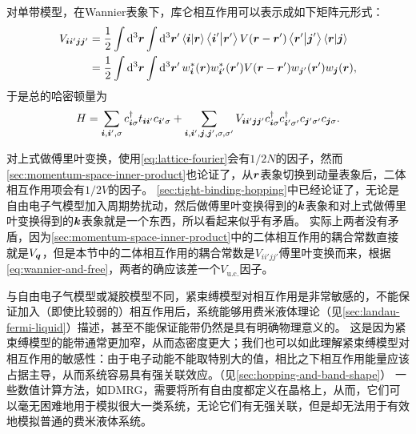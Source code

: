 对单带模型，在Wannier表象下，库仑相互作用可以表示成如下矩阵元形式：
\begin{equation}
    \begin{aligned}
        V_{\vb*{i} \vb*{i}' \vb*{j} \vb*{j}'} &= \frac{1}{2} \int \dd[3]{\vb*{r}} \int \dd[3]{\vb*{r}'} \braket{\vb*{i}}{\vb*{r}} \braket{\vb*{i}'}{\vb*{r}'} V(\vb*{r} - \vb*{r}') \braket{\vb*{r}'}{\vb*{j}'} \braket{\vb*{r}}{\vb*{j}} \\
        &= \frac{1}{2} \int \dd[3]{\vb*{r}} \int \dd[3]{\vb*{r}'} w_{\vb*{i}}^*(\vb*{r}) w_{\vb*{i}'}^*(\vb*{r}') V(\vb*{r} - \vb*{r}') w_{\vb*{j}'}(\vb*{r}') w_{\vb*{j}}(\vb*{r}),
    \end{aligned}
    \label{eq:wannier-basis-interaction}
\end{equation}
于是总的哈密顿量为
\begin{equation}
    H = \sum_{\vb*{i}, \vb*{i}', \sigma} c^\dagger_{\vb*{i} \sigma} t_{\vb*{i} \vb*{i}'} c_{\vb*{i}' \sigma} + \sum_{\vb*{i}, \vb*{i}', \vb*{j}, \vb*{j}', \sigma, \sigma'} V_{\vb*{i} \vb*{i}' \vb*{j} \vb*{j}'} c^\dagger_{\vb*{i} \sigma} c^\dagger_{\vb*{i}' \sigma'} c_{\vb*{j}' \sigma'} c_{\vb*{j} \sigma}.
\end{equation}

对上式做傅里叶变换，使用\eqref{eq:lattice-fourier}会有$1/2N$的因子，然而\autoref{sec:momentum-space-inner-product}也论证了，从$\vb*{r}$表象切换到动量表象后，二体相互作用项会有$1/2V$的因子。
\autoref{sec:tight-binding-hopping}中已经论证了，无论是自由电子气模型加入周期势扰动，然后做傅里叶变换得到的$\vb*{k}$表象和对上式做傅里叶变换得到的$\vb*{k}$表象就是一个东西，所以看起来似乎有矛盾。
实际上两者没有矛盾，因为\autoref{sec:momentum-space-inner-product}中的二体相互作用的耦合常数直接就是$V_{\vb*{q}}$，但是本节中的二体相互作用的耦合常数是$V_{i i' j j'}$傅里叶变换而来，根据\eqref{eq:wannier-and-free}，两者的确应该差一个$V_\text{u.c.}$因子。

与自由电子气模型或凝胶模型不同，紧束缚模型对相互作用是非常敏感的，不能保证加入（即使比较弱的）相互作用后，系统能够用费米液体理论（见\autoref{sec:landau-fermi-liquid}）描述，甚至不能保证能带仍然是具有明确物理意义的。
这是因为紧束缚模型的能带通常更加窄，从而态密度更大；我们也可以如此理解紧束缚模型对相互作用的敏感性：由于电子动能不能取特别大的值，相比之下相互作用能量应该占据主导，从而系统容易具有强关联效应。（见\autoref{sec:hopping-and-band-shape}）
一些数值计算方法，如DMRG，需要将所有自由度都定义在晶格上，从而，它们可以毫无困难地用于模拟很大一类系统，无论它们有无强关联，但是却无法用于有效地模拟普通的费米液体系统。

